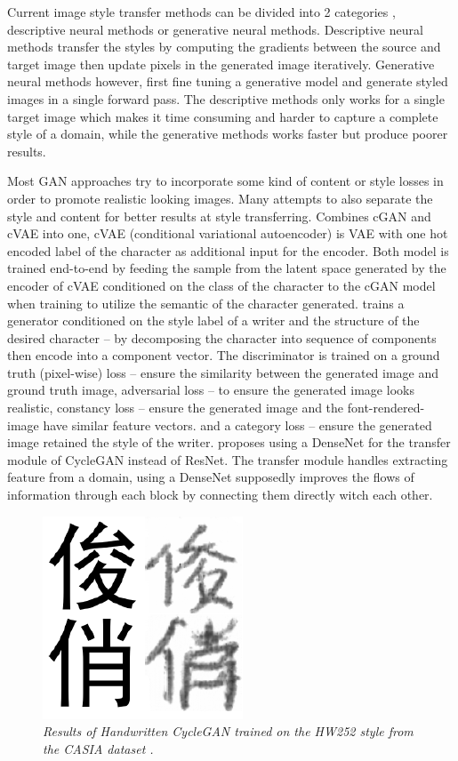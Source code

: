 \documentclass[12pt]{report}
\begin{document}
Current image style transfer methods can be divided into 2 categories \cite{neural-style}, descriptive neural methods or generative neural methods. Descriptive neural methods transfer the styles by computing the gradients between the source and target image then update pixels in the generated image iteratively. Generative neural methods however, first fine tuning a generative model and generate styled images in a single forward pass. The descriptive methods only works for a single target image which makes it time consuming and harder to capture a complete style of a domain, while the generative methods works faster but produce poorer results.

Most GAN\cite{gan} approaches try to incorporate some kind of content or style losses in order to promote realistic looking images. Many attempts to also separate the style and content for better results at style transferring.
\cite{handwritten-cgan} Combines cGAN \cite{cgan} and cVAE \cite{cvae} into one, cVAE (conditional variational autoencoder) is VAE with one hot encoded label of the character as additional input for the encoder. Both model is trained end-to-end by feeding the sample from the latent space generated by the encoder of cVAE conditioned on the class of the character to the cGAN model when training to utilize the semantic of the character generated.
\cite{calligan} trains a generator conditioned on the style label of a writer and the structure of the desired character – by decomposing the character into sequence of components then encode into a component vector. The discriminator is trained on a ground truth (pixel-wise) loss – ensure the similarity between the generated image and ground truth image, adversarial loss – to ensure the generated image looks realistic, constancy loss – ensure the generated image and the font-rendered-image have similar feature vectors. and a category loss – ensure the generated image retained the style of the writer.
\cite{handwritten-cyclegan} proposes using a DenseNet for the transfer module of CycleGAN instead of ResNet. The transfer module handles extracting feature from a domain, using a DenseNet supposedly improves the flows of information through each block by connecting them directly witch each other.

\begin{figure}[h]
	\centering
	\includegraphics[scale=0.9]{handwritten-cycle-gan-result}
	\caption{\textit{Results of Handwritten CycleGAN \cite{handwritten-cyclegan} trained on the HW252 style from the CASIA dataset \cite{casia}.}}
	\label{fig:handwritten-cycle-gan-result}
\end{figure}
\end{document}
